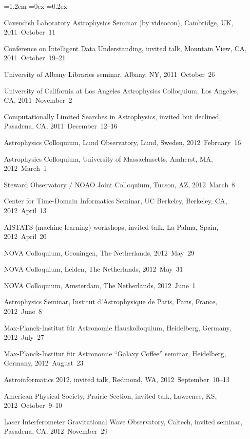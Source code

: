 \documentclass[10pt,letterpaper]{article}
\newcounter{refpubnum}
\newcommand{\hogglist}{%
    \rightmargin=0in
    \leftmargin=1.2em
    \topsep=0ex
    \partopsep=0pt
    \itemsep=0.2ex
    \parsep=0pt
    \itemindent=-1.0\leftmargin
    \listparindent=0.0\leftmargin
    \settowidth{\labelsep}{~}
    \usecounter{refpubnum}
  }
\begin{document}
\begin{list}{}{\hogglist}
{\item Cavendish Laboratory Astrophysics Seminar (by videocon),
          Cambridge, UK, 2011~October~11
\item Conference on Intelligent Data Understanding, invited talk,
          Mountain View, CA, 2011~October~19--21
\item University of Albany Libraries seminar,
          Albany, NY, 2011~October~26
\item University of California at Los Angeles Astrophysics Colloquium,
          Los Angeles, CA, 2011~November~2
\item Computationally Limited Searches in Astrophysics, invited but declined,
          Pasadena, CA, 2011~December~12--16
\item Astrophysics Colloquium, Lund Observatory,
          Lund, Sweden, 2012~February~16
\item Astrophysics Colloquium, University of Massachusetts,
          Amherst, MA, 2012~March~1
\item Steward Observatory / NOAO Joint Colloquium,
          Tucson, AZ, 2012~March~8
\item Center for Time-Domain Informatics Seminar, UC Berkeley,
          Berkeley, CA, 2012~April~13
\item AISTATS (machine learning) workshops, invited talk,
          La Palma, Spain, 2012~April~20
\item NOVA Colloquium,
          Groningen, The Netherlands, 2012~May~29
\item NOVA Colloquium,
          Leiden, The Netherlands, 2012~May~31
\item NOVA Colloquium,
          Amsterdam, The Netherlands, 2012~June~1
\item Astrophysics Seminar, Institut d'Astrophysique de Paris,
          Paris, France, 2012~June~8
\item Max-Planck-Institut f\"ur Astronomie Hauskolloquium,
          Heidelberg, Germany, 2012~July~27
\item Max-Planck-Institut f\"ur Astronomie ``Galaxy Coffee'' seminar,
          Heidelberg, Germany, 2012~August~23
\item Astroinformatics 2012, invited talk,
          Redmond, WA, 2012~September~10--13
\item American Physical Society, Prairie Section, invited talk,
          Lawrence, KS, 2012~October~9--10
\item Laser Interferometer Gravitational Wave Observatory, Caltech, invited seminar,
          Pasadena, CA, 2012~November~29
}
\end{list}
\end{document}
